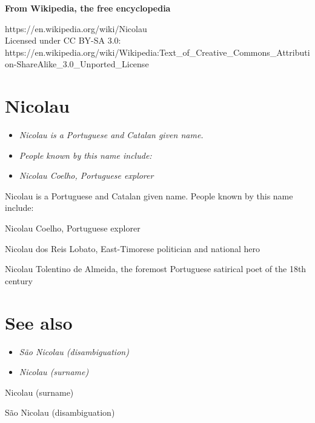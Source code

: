 \textbf{From Wikipedia, the free encyclopedia}

https://en.wikipedia.org/wiki/Nicolau\\
Licensed under CC BY-SA 3.0:\\
https://en.wikipedia.org/wiki/Wikipedia:Text\_of\_Creative\_Commons\_Attribution-ShareAlike\_3.0\_Unported\_License

\section{Nicolau}\label{nicolau}

\begin{itemize}
\item
  \emph{Nicolau is a Portuguese and Catalan given name.}
\item
  \emph{People known by this name include:}
\item
  \emph{Nicolau Coelho, Portuguese explorer}
\end{itemize}

Nicolau is a Portuguese and Catalan given name. People known by this
name include:

Nicolau Coelho, Portuguese explorer

Nicolau dos Reis Lobato, East-Timorese politician and national hero

Nicolau Tolentino de Almeida, the foremost Portuguese satirical poet of
the 18th century

\section{See also}\label{see-also}

\begin{itemize}
\item
  \emph{São Nicolau (disambiguation)}
\item
  \emph{Nicolau (surname)}
\end{itemize}

Nicolau (surname)

São Nicolau (disambiguation)

